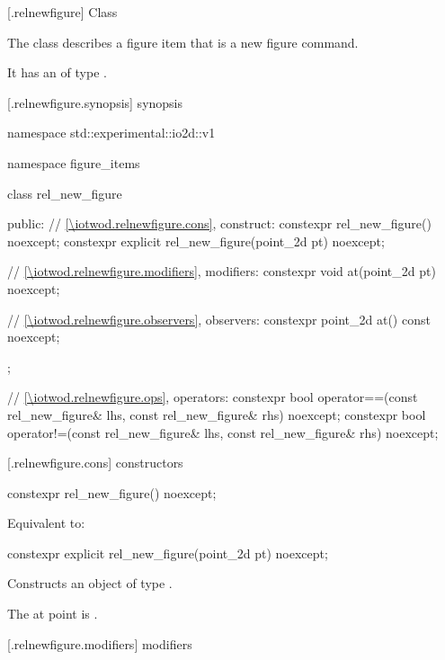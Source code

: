  [\iotwod.relnewfigure] {Class }%

\pnum
{}%
The class  describes a figure item that is a new figure command.

\pnum
It has an  of type .

 [\iotwod.relnewfigure.synopsis] { synopsis}%

\begin{codeblock}
namespace std::experimental::io2d::v1 {
  namespace figure_items {
    class rel_new_figure {
    public:
      // \ref{\iotwod.relnewfigure.cons}, construct:
      constexpr rel_new_figure() noexcept;
      constexpr explicit rel_new_figure(point_2d pt) noexcept;

      // \ref{\iotwod.relnewfigure.modifiers}, modifiers:
      constexpr void at(point_2d pt) noexcept;

      // \ref{\iotwod.relnewfigure.observers}, observers:
      constexpr point_2d at() const noexcept;
    };
    
  // \ref{\iotwod.relnewfigure.ops}, operators:
  constexpr bool operator==(const rel_new_figure& lhs, const rel_new_figure& rhs) 
    noexcept;
  constexpr bool operator!=(const rel_new_figure& lhs, const rel_new_figure& rhs) 
    noexcept;
  }
}
\end{codeblock}

 [\iotwod.relnewfigure.cons] { constructors}%

%
\begin{itemdecl}
constexpr rel_new_figure() noexcept;
\end{itemdecl}
\begin{itemdescr}
\pnum
\effects
Equivalent to: 
\end{itemdescr}

%
\begin{itemdecl}
constexpr explicit rel_new_figure(point_2d pt) noexcept;
\end{itemdecl}
\begin{itemdescr}
\pnum
\effects
Constructs an object of type .

\pnum
The at point is .
\end{itemdescr}

 [\iotwod.relnewfigure.modifiers]{ modifiers}%

